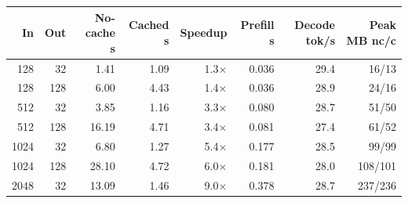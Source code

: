 \begin{tabular}{rrrrrrrr}\toprule In & Out & No-cache s & Cached s & Speedup & Prefill s & Decode tok/s & Peak MB nc/c\\\midrule
128 & 32 & 1.41 & 1.09 & 1.3$\times$ & 0.036 & 29.4 & 16/13\\
128 & 128 & 6.00 & 4.43 & 1.4$\times$ & 0.036 & 28.9 & 24/16\\
512 & 32 & 3.85 & 1.16 & 3.3$\times$ & 0.080 & 28.7 & 51/50\\
512 & 128 & 16.19 & 4.71 & 3.4$\times$ & 0.081 & 27.4 & 61/52\\
1024 & 32 & 6.80 & 1.27 & 5.4$\times$ & 0.177 & 28.5 & 99/99\\
1024 & 128 & 28.10 & 4.72 & 6.0$\times$ & 0.181 & 28.0 & 108/101\\
2048 & 32 & 13.09 & 1.46 & 9.0$\times$ & 0.378 & 28.7 & 237/236\\
\bottomrule\end{tabular}
